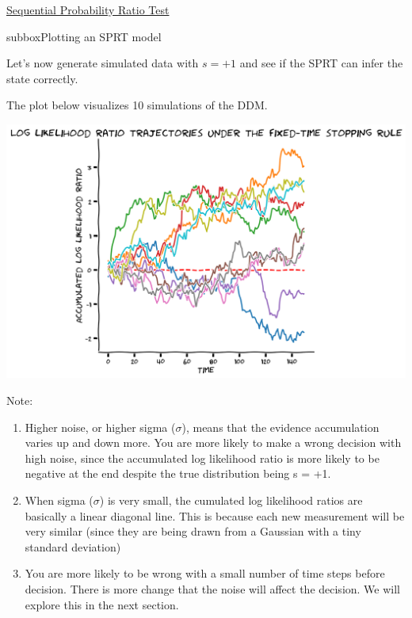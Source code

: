 \begin{textbox}{\href{https://compneuro.neuromatch.io/tutorials/W3D2_HiddenDynamics/student/W3D2_Tutorial1.html}{Sequential Probability Ratio Test }   }

\begin{subbox}{subbox}{Plotting an SPRT model}
\scriptsize


Let's now generate simulated data with $s=+1$ and see if the SPRT can infer the state correctly.

The plot below visualizes 10 simulations of the DDM.
\begin{center}
    
\includegraphics[scale=0.25]{Figures/HD/HD_Figure1.png}
\end{center}
Note:
\begin{enumerate}
    \item 
Higher noise, or higher sigma ($\sigma$), means that the evidence accumulation varies up
   and down more. You are more likely to make a wrong decision with high noise,
   since the accumulated log likelihood ratio is more likely to be negative at the end
   despite the true distribution being s = +1.

\item When sigma ($\sigma$) is very small, the cumulated log likelihood ratios are basically a linear
   diagonal line. This is because each new measurement will be very similar (since they are
   being drawn from a Gaussian with a tiny standard deviation)

\item You are more likely to be wrong with a small number of time steps before decision. There is
   more change that the noise will affect the decision. We will explore this in the next section.
\end{enumerate}

\end{subbox}
\end{textbox}
